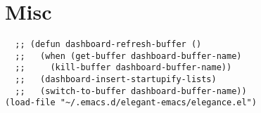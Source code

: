 \documentclass[11pt]{article}
\begin{document}
\section{Misc}
\label{sec:orgbbe5b00}

\begin{verbatim}
  ;; (defun dashboard-refresh-buffer ()
  ;;   (when (get-buffer dashboard-buffer-name)
  ;;     (kill-buffer dashboard-buffer-name))
  ;;   (dashboard-insert-startupify-lists)
  ;;   (switch-to-buffer dashboard-buffer-name))
(load-file "~/.emacs.d/elegant-emacs/elegance.el")
\end{verbatim}
\end{document}
